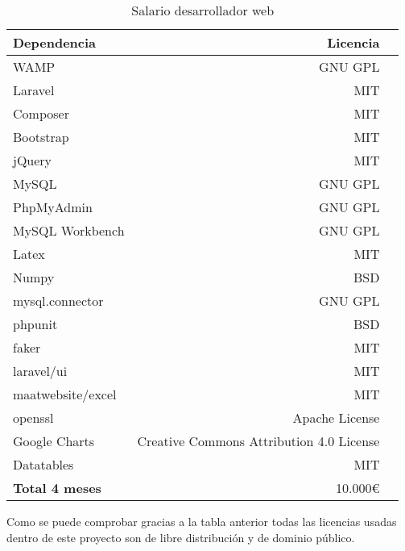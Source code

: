 \begin{table}[H]
	 \begin{tabularx}{\linewidth}{X r r}
	 	\toprule \textbf{Dependencia} & \textbf{Licencia} \\
	 	\toprule
        WAMP &  GNU GPL\\
        Laravel & MIT   \\
        Composer & MIT   \\
        Bootstrap & MIT   \\
        jQuery & MIT   \\
        MySQL & GNU GPL \\
        PhpMyAdmin & GNU GPL  \\
        MySQL Workbench & GNU GPL  \\
        Latex & MIT   \\
        Numpy & BSD   \\
        mysql.connector & GNU GPL \\
        phpunit & BSD  \\
        faker & MIT   \\
        laravel/ui & MIT   \\
        maatwebsite/excel & MIT   \\
        openssl & Apache License   \\
        Google Charts & Creative Commons Attribution 4.0 License   \\
        Datatables & MIT   \\
        \midrule
	    \textbf{Total 4 meses} & 10.000€  \\
	 	\bottomrule
	 \end{tabularx}
	 \caption{Salario desarrollador web}
\end{table} 

Como se puede comprobar gracias a la tabla anterior todas las licencias usadas dentro de este proyecto son de libre distribución y de dominio público.

